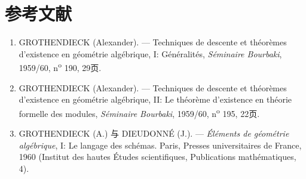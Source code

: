 \section*{参考文献}

\begin{enumerate}
\item[{[1]}]\label{fga3.iii-bib-1} GROTHENDIECK (Alexander). --- Techniques de descente et théorèmes d'existence en géométrie algébrique, I: Généralités, \emph{Séminaire Bourbaki}, 1959/60, n\textsuperscript{o} 190, 29页.
\item[{[2]}]\label{fga3.iii-bib-2} GROTHENDIECK (Alexander). --- Techniques de descente et théorèmes d'existence en géométrie algébrique, II: Le théorème d'existence en théorie formelle des modules, \emph{Séminaire Bourbaki}, 1959/60, n\textsuperscript{o} 195, 22页.
\item[{[3]}]\label{fga3.iii-bib-3} GROTHENDIECK (A.) 与 DIEUDONNÉ (J.). --- \emph{Éléments de géométrie algébrique}, I: Le langage des schémas. Paris, Presses universitaires de France, 1960 (Institut des hautes Études scientifiques, Publications mathématiques, 4).

\end{enumerate}
